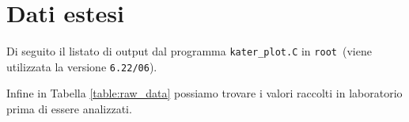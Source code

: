 \documentclass[italian, a4paper, 10pt, twocolumn]{../../style/lab_unige}
\newcommand{\reftab}[1]{Tabella {\ref{#1}}}%
\newcommand{\cernroot}{\texttt{root}}
\begin{document}
    \appendix

    \setcounter{table}{0}
    \renewcommand{\thetable}{A\arabic{table}}
    

    \section{Dati estesi}
    Di seguito il listato di output dal programma \verb|kater_plot.C| in \cernroot~(viene utilizzata la versione \verb|6.22/06|).
    

    Infine in \reftab{table:raw_data} possiamo trovare i valori raccolti in laboratorio prima di essere analizzati.
    
\end{document}
